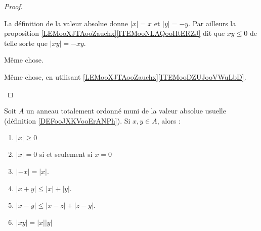 \begin{proof}
\begin{subproof}
\begin{subproof}
			La définition de la valeur absolue donne \( | x |=x\) et \( | y |=-y\). Par ailleurs la proposition \ref{LEMooXJTAooZauchx}\ref{ITEMooNLAQooHtERZJ} dit que \( xy\leq 0\) de telle sorte que \( | xy |=-xy\).

			Même chose.

			\spitem[Si \( x,y\leq 0\)]
			Même chose, en utilisant \ref{LEMooXJTAooZauchx}\ref{ITEMooDZUJooVWuLbD}.
		\end{subproof}
	\end{subproof}
\end{proof}



\begin{lemma}  \label{LemooANTJooYxQZDw}
	Soit \( A \) un anneau totalement ordonné muni de la valeur absolue usuelle (définition \ref{DEFooJXKVooErANPh}). Si \( x,y\in A\),  alors :
	\begin{enumerate}
		\item       \label{ITEMooSDNHooDnjScE}
		      \( | x |\geq 0\)
		\item       \label{ITEMooLQLTooTJTPVM}
		      \( | x |=0\) si et seulement si \( x=0\)
		\item       \label{ITEMooVJAEooOEatzY}
		      \( | -x |=| x |\).
		\item			\label{ItemooOMKNooRlanvk}
		      \( | x+y |\leq | x |+| y |\).
		\item		\label{ITEMooISWFooMeOtjZ}
		      \( | x-y |\leq | x-z |+| z-y |\).
		\item		\label{ITEMooEFMLooYVCuHD}
		      \( | xy |=| x | |y |\)
	\end{enumerate}
\end{lemma}

